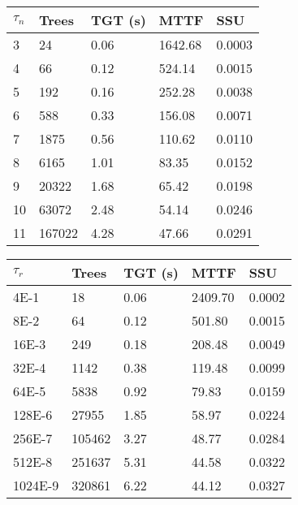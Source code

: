 \documentclass[12pt]{article}
\begin{document}
\begin{center}
	\begin{tabular}{|l|l|l|l|l|}
	\hline
    $\tau_n$  & Trees   & TGT (s) & MTTF   & SSU    \\ \hline
    3	&	24	&	0.06	&	1642.68	&	0.0003	\\ \hline
	4	&	66	&	0.12	&	524.14	&	0.0015	\\ \hline
	5	&	192	&	0.16	&	252.28	&	0.0038	\\ \hline
	6	&	588	&	0.33	&	156.08	&	0.0071	\\ \hline
	7	&	1875	&	0.56	&	110.62	&	0.0110	\\ \hline
	8	&	6165	&	1.01	&	83.35	&	0.0152	\\ \hline
	9	&	20322	&	1.68	&	65.42	&	0.0198	\\ \hline
	10	&	63072	&	2.48	&	54.14	&	0.0246	\\ \hline
	11	&	167022	&	4.28	&	47.66	&	0.0291	\\ \hline
    \end{tabular}
\end{center}

\begin{center}
	\begin{tabular}{|l|l|l|l|l|}
	\hline
    $\tau_r$      & Trees  & TGT (s) & MTTF    & SSU    \\ \hline
    4E-1	&	18	&	0.06	&	2409.70	&	0.0002	\\ \hline
	8E-2	&	64	&	0.12	&	501.80	&	0.0015	\\ \hline
	16E-3	&	249	&	0.18	&	208.48	&	0.0049	\\ \hline
	32E-4	&	1142	&	0.38	&	119.48	&	0.0099	\\ \hline
	64E-5	&	5838	&	0.92	&	79.83	&	0.0159	\\ \hline
	128E-6	&	27955	&	1.85	&	58.97	&	0.0224	\\ \hline
	256E-7	&	105462	&	3.27	&	48.77	&	0.0284	\\ \hline
	512E-8	&	251637	&	5.31	&	44.58	&	0.0322	\\ \hline
	1024E-9	&	320861	&	6.22	&	44.12	&	0.0327	\\ \hline
    \end{tabular}
\end{center}
\end{document}
